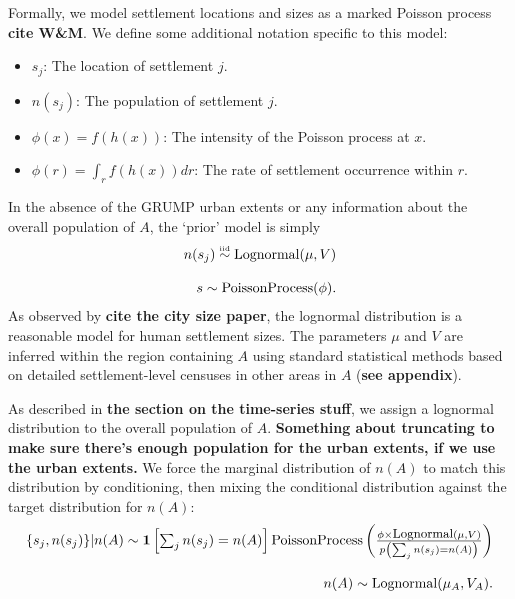 \documentclass[a4paper]{article}
\begin{document}
Formally, we model settlement locations and sizes as a marked Poisson process \textbf{cite W\&M}. We define some additional notation specific to this model:
\begin{itemize}
	\item $s_j$: The location of settlement $j$.
	\item $n(s_j)$: The population of settlement $j$.
	\item $\phi(x)=f(h(x))$: The intensity of the Poisson process at $x$.
	\item $\phi(r)=\int_r f(h(x))dr$: The rate of settlement occurrence within $r$.
\end{itemize}
In the absence of the GRUMP urban extents or any information about the overall population of $A$, the `prior' model is simply
\begin{equation}
	\label{eq:base_model}
	\begin{array}{r}
		n(s_j) \stackrel{\textup{\tiny iid}}{\sim} \textup{Lognormal}(\mu, V)\\\\
		s \sim \textup{PoissonProcess}(\phi).
	\end{array}
\end{equation}
As observed by \textbf{cite the city size paper}, the lognormal distribution is a reasonable model for human settlement sizes. The parameters $\mu$ and $V$ are inferred within the region containing $A$ using standard statistical methods based on detailed settlement-level censuses in other areas in $A$ (\textbf{see appendix}).

As described in \textbf{the section on the time-series stuff}, we assign a lognormal distribution to the overall population of $A$. \textbf{Something about truncating to make sure there's enough population for the urban extents, if we use the urban extents.} We force the marginal distribution of $n(A)$ to match this distribution by conditioning, then mixing the conditional distribution against the target distribution for $n(A)$:
\begin{equation}
	\label{eq:cond_on_fullpop}
	\begin{array}{r}
		\{s_j,n(s_j)\}|n(A) \sim \mathbf{1}\left[\sum_j n(s_j)=n(A)\right]\textup{PoissonProcess}
		\left(\frac{\phi\times\textup{\small Lognormal}(\mu,V)}{p\left(\sum_j n(s_j)=n(A)\right)}\right)\\\\
		n(A) \sim \textup{Lognormal}(\mu_A, V_A).
	\end{array}
\end{equation}
\end{document}
